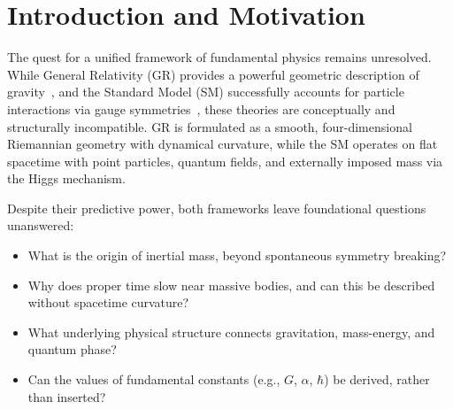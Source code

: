 \documentclass[preprint]{revtex4-2}
\begin{document}
\begin{abstract}
                \paragraph{Swirl Clock scaling.}
                    The Swirl Clock relation becomes
                    \begin{equation}
                        dt_{\mathrm{local}} = dt_\infty \sqrt{1 - \frac{(3 v_c)^2}{c^2}},\label{eq:baryon-swirl-clock}
                    \end{equation}
                    predicting a more pronounced local time dilation, consistent with the larger rest mass of baryons relative to single quark knots.

                    \emph{Analogy (for intuition).} Three equal water whirls feed one outlet: the hole may widen slightly, but the combined spin deepens the whirl and speeds the rim roughly threefold.




\end{abstract}
\maketitle

\newpage
\begingroup
\setlength{\baselineskip}{0.9\baselineskip}  %
\tableofcontents
\endgroup
\vspace{1em}
\newpage
\section{Introduction and Motivation}\label{sec:introduction-and-motivation}
    The quest for a unified framework of fundamental physics remains unresolved. While General Relativity (GR) provides a powerful geometric description of gravity~\cite{einstein1915gr}, and the Standard Model (SM) successfully accounts for particle interactions via gauge symmetries~\cite{weinberg1995quantum}, these theories are conceptually and structurally incompatible. GR is formulated as a smooth, four-dimensional Riemannian geometry with dynamical curvature, while the SM operates on flat spacetime with point particles, quantum fields, and externally imposed mass via the Higgs mechanism.

    Despite their predictive power, both frameworks leave foundational questions unanswered:
    \begin{itemize}
        \item What is the origin of inertial mass, beyond spontaneous symmetry breaking?
        \item Why does proper time slow near massive bodies, and can this be described without spacetime curvature?
        \item What underlying physical structure connects gravitation, mass-energy, and quantum phase?
        \item Can the values of fundamental constants (e.g., $G$, $\alpha$, $\hbar$) be derived, rather than inserted?
    \end{itemize}
\end{document}
